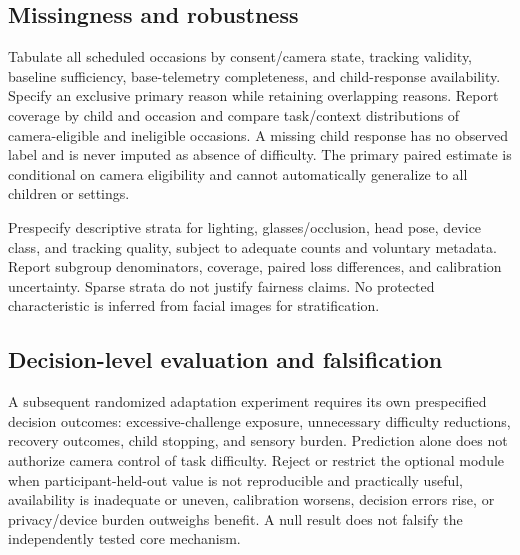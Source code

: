 \subsection{Missingness and robustness}

Tabulate all scheduled occasions by consent/camera state, tracking validity, baseline sufficiency, base-telemetry completeness, and child-response availability. Specify an exclusive primary reason while retaining overlapping reasons. Report coverage by child and occasion and compare task/context distributions of camera-eligible and ineligible occasions. A missing child response has no observed label and is never imputed as absence of difficulty. The primary paired estimate is conditional on camera eligibility and cannot automatically generalize to all children or settings.

Prespecify descriptive strata for lighting, glasses/occlusion, head pose, device class, and tracking quality, subject to adequate counts and voluntary metadata. Report subgroup denominators, coverage, paired loss differences, and calibration uncertainty. Sparse strata do not justify fairness claims. No protected characteristic is inferred from facial images for stratification.

\subsection{Decision-level evaluation and falsification}

A subsequent randomized adaptation experiment requires its own prespecified decision outcomes: excessive-challenge exposure, unnecessary difficulty reductions, recovery outcomes, child stopping, and sensory burden. Prediction alone does not authorize camera control of task difficulty. Reject or restrict the optional module when participant-held-out value is not reproducible and practically useful, availability is inadequate or uneven, calibration worsens, decision errors rise, or privacy/device burden outweighs benefit. A null result does not falsify the independently tested core mechanism.
